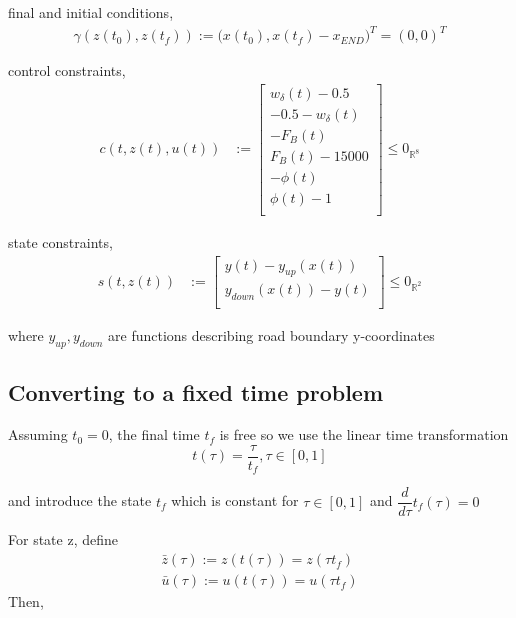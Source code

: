 \documentclass{article}
\begin{document}
final and initial conditions,
\begin{align}
    \gamma(z(t_0), z(t_f)) := \big(x(t_0), x(t_f)-x_{END})^T = (0, 0)^T
\end{align}

control constraints,
\begin{align}
    c(t, z(t), u(t)) &:= \begin{bmatrix}
                            w_\delta(t) - 0.5 \\
                          -0.5 - w_\delta(t) \\
                           -F_B(t) \\
                           F_B(t) - 15000\\
                           -\phi(t) \\
                           \phi(t) - 1\\
         \end{bmatrix} \leq 0_{\mathbb{R}^8}
\end{align}

state constraints,
\begin{align}
    s(t, z(t)) &:= \begin{bmatrix}
                            y(t) - y_{up}(x(t)) \\
                            y_{down}(x(t)) - y(t)\\
                    \end{bmatrix} \leq 0_{\mathbb{R}^2}
\end{align}

where \(y_{up}, y_{down}\) are functions describing road boundary y-coordinates



\subsection{Converting to a fixed time problem}

Assuming \(t_0 = 0\), the final time \(t_f\) is free so we use the linear time transformation
\begin{equation}
    t(\tau) = \dfrac{\tau}{t_f},  \tau \in [0,1]
\end{equation}

and introduce the state \(t_f\) which is constant for \(\tau \in [0,1]\) and \( \dfrac{d}{d\tau}t_f(\tau) = 0 \)

For state z, define 
\begin{align*}
\bar{z}(\tau) := z(t(\tau)) = z(\tau t_f) \\
\bar{u}(\tau) := u(t(\tau)) = u(\tau t_f)
\end{align*}
Then, 
\end{document}
